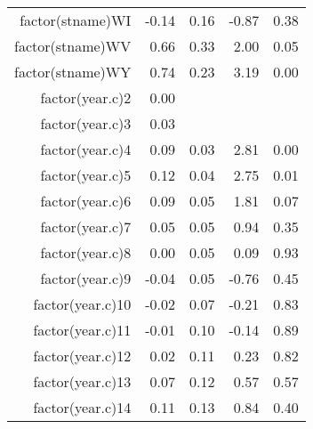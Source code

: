 \begin{table}[ht]
\begin{tabular}{rrrrr}
  factor(stname)WI & -0.14 & 0.16 & -0.87 & 0.38 \\ 
  factor(stname)WV & 0.66 & 0.33 & 2.00 & 0.05 \\ 
  factor(stname)WY & 0.74 & 0.23 & 3.19 & 0.00 \\ 
  factor(year.c)2 & 0.00 &  &  &  \\ 
  factor(year.c)3 & 0.03 &  &  &  \\ 
  factor(year.c)4 & 0.09 & 0.03 & 2.81 & 0.00 \\ 
  factor(year.c)5 & 0.12 & 0.04 & 2.75 & 0.01 \\ 
  factor(year.c)6 & 0.09 & 0.05 & 1.81 & 0.07 \\ 
  factor(year.c)7 & 0.05 & 0.05 & 0.94 & 0.35 \\ 
  factor(year.c)8 & 0.00 & 0.05 & 0.09 & 0.93 \\ 
  factor(year.c)9 & -0.04 & 0.05 & -0.76 & 0.45 \\ 
  factor(year.c)10 & -0.02 & 0.07 & -0.21 & 0.83 \\ 
  factor(year.c)11 & -0.01 & 0.10 & -0.14 & 0.89 \\ 
  factor(year.c)12 & 0.02 & 0.11 & 0.23 & 0.82 \\ 
  factor(year.c)13 & 0.07 & 0.12 & 0.57 & 0.57 \\ 
  factor(year.c)14 & 0.11 & 0.13 & 0.84 & 0.40 \\ 
   \hline
\end{tabular}
\end{table}

